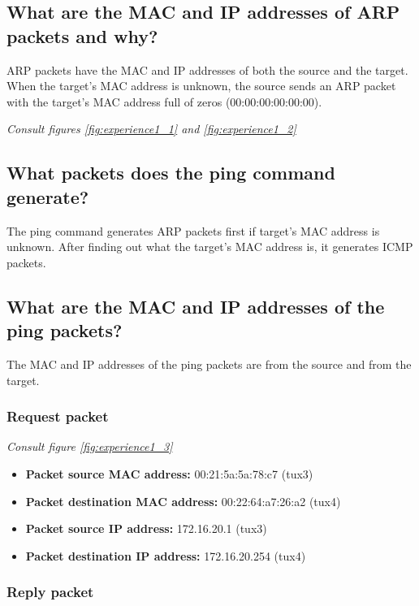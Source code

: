 \documentclass[11pt]{report}
\begin{document}
\subsection{What are the MAC and IP addresses of ARP packets and why?}

ARP packets have the MAC and IP addresses of both the source and the target. When the target's MAC address is unknown, the source sends an ARP packet with the target's MAC address full of zeros (00:00:00:00:00:00). 

\textit{Consult figures \ref{fig:experience1_1} and \ref{fig:experience1_2}}

\subsection{What packets does the ping command generate?}

The ping command generates ARP packets first if target's MAC address is unknown. After finding out what the target's MAC address is, it generates ICMP packets.

\subsection{What are the MAC and IP addresses of the ping packets?}

The MAC and IP addresses of the ping packets are from the source and from the target.

\subsubsection{Request packet} 

\textit{Consult figure \ref{fig:experience1_3}}

\begin{itemize}
    \item \textbf{Packet source MAC address:} 00:21:5a:5a:78:c7 (tux3)
    \item \textbf{Packet destination MAC address:} 00:22:64:a7:26:a2 (tux4)
    \item \textbf{Packet source IP address:} 172.16.20.1 (tux3)
    \item \textbf{Packet destination IP address:} 172.16.20.254 (tux4)
\end{itemize}

\subsubsection{Reply packet}
\end{document}
